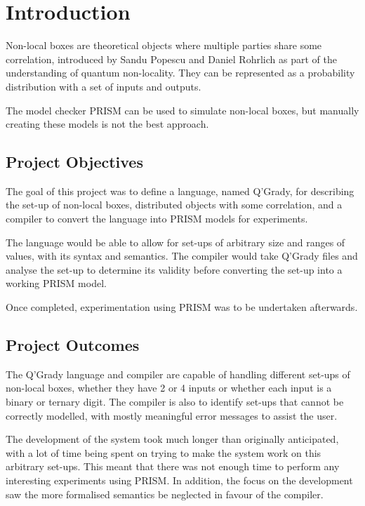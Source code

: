 \documentclass[report.tex]{subfiles}
\begin{document}
\chapter{Introduction} %
\label{cha:introduction}
Non-local boxes are theoretical objects where multiple parties share some
correlation, introduced by Sandu Popescu and Daniel Rohrlich as part of the
understanding of quantum non-locality. They can be represented as a probability
distribution with a set of inputs and outputs.

The model checker PRISM can be used to simulate non-local boxes, but manually creating these models is not the best approach.

\section{Project Objectives} %
\label{sec:project_objectives}
The goal of this project was to define a language, named Q'Grady, for describing
the set-up of non-local boxes, distributed objects with some correlation, and a
compiler to convert the language into PRISM models for experiments.

The language would be able to allow for set-ups of arbitrary size and ranges of
values, with its syntax and semantics. The compiler would take Q'Grady files and
analyse the set-up to determine its validity before converting the set-up into a
working PRISM model.

Once completed, experimentation using PRISM was to be undertaken afterwards.
\section{Project Outcomes} %
\label{sec:project_outcomes}
The Q'Grady language and compiler are capable of handling different set-ups of
non-local boxes, whether they have 2 or 4 inputs or whether each input is a
binary or ternary digit. The compiler is also to identify set-ups that cannot be
correctly modelled, with mostly meaningful error messages to assist the user.

The development of the system took much longer than originally anticipated, with
a lot of time being spent on trying to make the system work on this arbitrary
set-ups. This meant that there was not enough time to perform any interesting
experiments using PRISM. In addition, the focus on the development saw the
more formalised semantics be neglected in favour of the compiler.
\end{document}

